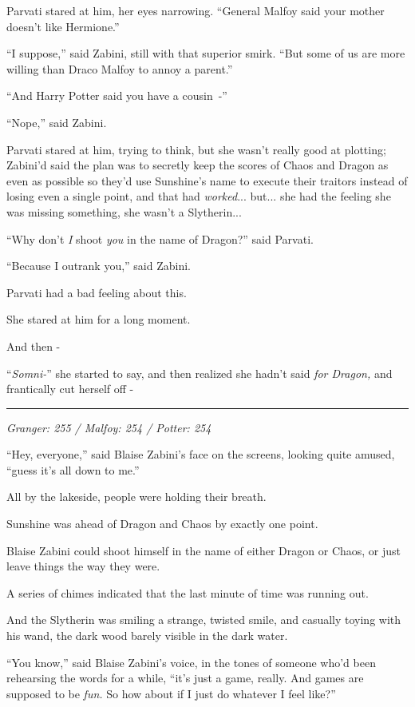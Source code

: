 Parvati stared at him, her eyes narrowing. ``General Malfoy said your mother doesn't like Hermione.''

``I suppose,'' said Zabini, still with that superior smirk. ``But some of us are more willing than Draco Malfoy to annoy a parent.''

``And Harry Potter said you have a cousin~-''

``Nope,'' said Zabini.

Parvati stared at him, trying to think, but she wasn't really good at plotting; Zabini'd said the plan was to secretly keep the scores of Chaos and Dragon as even as possible so they'd use Sunshine's name to execute their traitors instead of losing even a single point, and that had \emph{worked}... but... she had the feeling she was missing something, she wasn't a Slytherin...

``Why don't \emph{I} shoot \emph{you} in the name of Dragon?'' said Parvati.

``Because I outrank you,'' said Zabini.

Parvati had a bad feeling about this.

She stared at him for a long moment.

And then -

``\emph{Somni-}'' she started to say, and then realized she hadn't said \emph{for Dragon,} and frantically cut herself off -

\begin{center}\rule{3in}{0.4pt}\end{center}

\emph{Granger: 255 / Malfoy: 254 / Potter: 254}

``Hey, everyone,'' said Blaise Zabini's face on the screens, looking quite amused, ``guess it's all down to me.''

All by the lakeside, people were holding their breath.

Sunshine was ahead of Dragon and Chaos by exactly one point.

Blaise Zabini could shoot himself in the name of either Dragon or Chaos, or just leave things the way they were.

A series of chimes indicated that the last minute of time was running out.

And the Slytherin was smiling a strange, twisted smile, and casually toying with his wand, the dark wood barely visible in the dark water.

``You know,'' said Blaise Zabini's voice, in the tones of someone who'd been rehearsing the words for a while, ``it's just a game, really. And games are supposed to be \emph{fun.} So how about if I just do whatever I feel like?''
